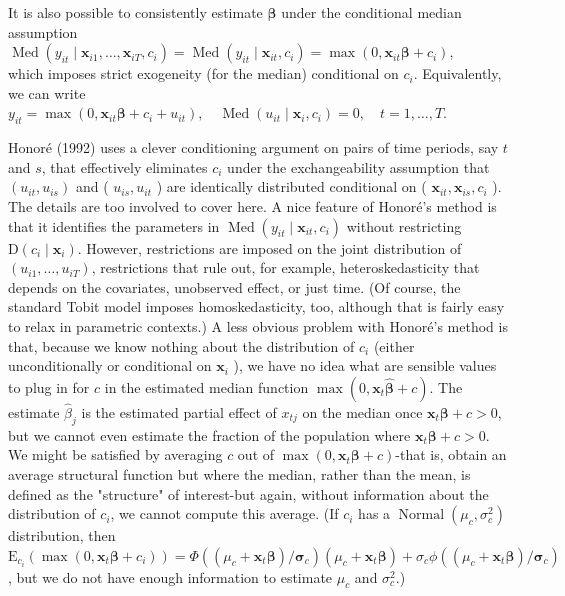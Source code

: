 \documentclass[10pt]{article}
\begin{document}
It is also possible to consistently estimate $\boldsymbol{\beta}$ under the conditional median assumption\\
$\operatorname{Med}\left(y_{i t} \mid \mathbf{x}_{i 1}, \ldots, \mathbf{x}_{i T}, c_{i}\right)=\operatorname{Med}\left(y_{i t} \mid \mathbf{x}_{i t}, c_{i}\right)=\max \left(0, \mathbf{x}_{i t} \boldsymbol{\beta}+c_{i}\right)$,\\
which imposes strict exogeneity (for the median) conditional on $c_{i}$. Equivalently, we can write\\
$y_{i t}=\max \left(0, \mathbf{x}_{i t} \boldsymbol{\beta}+c_{i}+u_{i t}\right), \quad \operatorname{Med}\left(u_{i t} \mid \mathbf{x}_{i}, c_{i}\right)=0, \quad t=1, \ldots, T$.

Honoré (1992) uses a clever conditioning argument on pairs of time periods, say $t$ and $s$, that effectively eliminates $c_{i}$ under the exchangeability assumption that $\left(u_{i t}, u_{i s}\right)$ and ( $u_{i s}, u_{i t}$ ) are identically distributed conditional on ( $\mathbf{x}_{i t}, \mathbf{x}_{i s}, c_{i}$ ). The details are too involved to cover here. A nice feature of Honoré's method is that it identifies the parameters in $\operatorname{Med}\left(y_{i t} \mid \mathbf{x}_{i t}, c_{i}\right)$ without restricting $\mathrm{D}\left(c_{i} \mid \mathbf{x}_{i}\right)$. However, restrictions are imposed on the joint distribution of $\left(u_{i 1}, \ldots, u_{i T}\right)$, restrictions that rule out, for example, heteroskedasticity that depends on the covariates, unobserved effect, or just time. (Of course, the standard Tobit model imposes homoskedasticity, too, although that is fairly easy to relax in parametric contexts.) A less obvious problem with Honoré's method is that, because we know nothing about the distribution of $c_{i}$ (either unconditionally or conditional on $\mathbf{x}_{i}$ ), we have no idea what are sensible values to plug in for $c$ in the estimated median function $\max \left(0, \mathbf{x}_{t} \hat{\boldsymbol{\beta}}+c\right)$. The estimate $\hat{\beta}_{j}$ is the estimated partial effect of $x_{t j}$ on the median once $\mathbf{x}_{t} \boldsymbol{\beta}+c>0$, but we cannot even estimate the fraction of the population where $\mathbf{x}_{t} \boldsymbol{\beta}+c>0$. We might be satisfied by averaging $c$ out of $\max \left(0, \mathbf{x}_{t} \boldsymbol{\beta}+c\right)$-that is, obtain an average structural function but where the median, rather than the mean, is defined as the "structure" of interest-but again, without information about the distribution of $c_{i}$, we cannot compute this average. (If $c_{i}$ has a $\operatorname{Normal}\left(\mu_{c}, \sigma_{c}^{2}\right)$ distribution, then $\mathrm{E}_{c_{i}}\left(\max \left(0, \mathbf{x}_{t} \boldsymbol{\beta}+c_{i}\right)\right)= \Phi\left(\left(\mu_{c}+\mathbf{x}_{t} \boldsymbol{\beta}\right) / \boldsymbol{\sigma}_{c}\right)\left(\mu_{c}+\mathbf{x}_{t} \boldsymbol{\beta}\right)+\sigma_{c} \phi\left(\left(\mu_{c}+\mathbf{x}_{t} \boldsymbol{\beta}\right) / \boldsymbol{\sigma}_{c}\right)$, but we do not have enough information to estimate $\mu_{c}$ and $\sigma_{c}^{2}$.)
\end{document}
